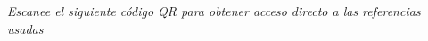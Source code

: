 
\centering
{\footnotesize\textcolor{migris}{\textit{Escanee el siguiente código QR para obtener acceso directo a las referencias usadas}}}